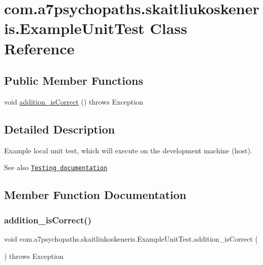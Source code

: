 \hypertarget{classcom_1_1a7psychopaths_1_1skaitliukoskeneris_1_1_example_unit_test}{}\section{com.\+a7psychopaths.\+skaitliukoskeneris.\+Example\+Unit\+Test Class Reference}
\label{classcom_1_1a7psychopaths_1_1skaitliukoskeneris_1_1_example_unit_test}
\subsection*{Public Member Functions}
\begin{DoxyCompactItemize}
\item 
void \mbox{\hyperlink{classcom_1_1a7psychopaths_1_1skaitliukoskeneris_1_1_example_unit_test_a313641f21c41c4283b8f46f1f8d7dcbf}{addition\+\_\+is\+Correct}} ()  throws Exception 
\end{DoxyCompactItemize}


\subsection{Detailed Description}
Example local unit test, which will execute on the development machine (host).

\begin{DoxySeeAlso}{See also}
\href{http://d.android.com/tools/testing}{\tt Testing documentation} 
\end{DoxySeeAlso}


\subsection{Member Function Documentation}
\mbox{\label{classcom_1_1a7psychopaths_1_1skaitliukoskeneris_1_1_example_unit_test_a313641f21c41c4283b8f46f1f8d7dcbf}} 
\subsubsection{\texorpdfstring{addition\+\_\+is\+Correct()}{addition\_isCorrect()}}
{\footnotesize\ttfamily void com.\+a7psychopaths.\+skaitliukoskeneris.\+Example\+Unit\+Test.\+addition\+\_\+is\+Correct (\begin{DoxyParamCaption}{ }\end{DoxyParamCaption}) throws Exception}



